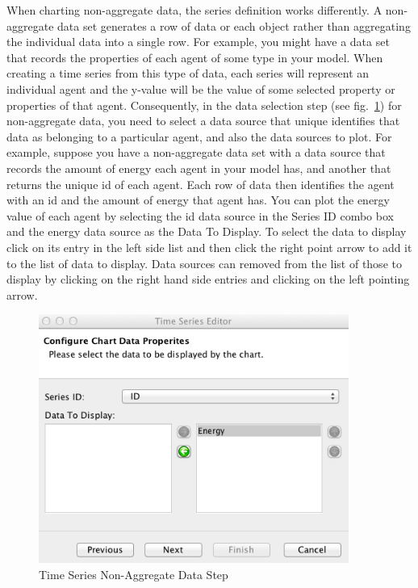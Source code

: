 \documentclass[11pt]{amsart}
\begin{document}
When charting non-aggregate data, the series definition works differently. A non-aggregate data set  generates a row of data  or each object rather than aggregating the individual data into a single row. For example, you might have a data set that records the properties of each agent of some type in your model. When creating a time series from this type of data, each series will represent an individual agent and the y-value will be the value of some selected property or properties of that agent. Consequently, in the data selection step (see fig.~\ref{fig:ts3}) for non-aggregate data, you need to select a data source that unique identifies that data as belonging to a particular agent, and also the data sources to plot. For example, suppose you have a non-aggregate data set with a data source that records the amount of energy each agent in your model has, and another that returns the unique id of each agent. Each row of data then identifies the agent with an id and the amount of energy that agent has. You can plot the energy value of each agent by selecting the id data source in the Series ID combo box and the energy data source as the Data To Display. To select the data to display click on its entry in the left side list and then click the right point arrow to add it to the list of data to display. Data sources can removed from the list of those to display by clicking on the right hand side entries and clicking on the left pointing arrow.

\begin{figure}[h]
\begin{center}
\vspace{.2in}
\centerline {
\includegraphics[width=4in]{images/ts3.png}
}
\caption{Time Series Non-Aggregate Data Step}
\label{fig:ts3}
\end{center}
\end{figure}
\end{document}
